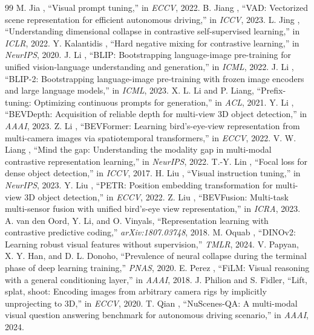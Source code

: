 \documentclass[10pt,twocolumn,letterpaper]{article}
\begin{document}
\begin{thebibliography}{99}
 M. Jia \etal, ``Visual prompt tuning,'' in \emph{ECCV}, 2022.
 B. Jiang \etal, ``VAD: Vectorized scene representation for efficient autonomous driving,'' in \emph{ICCV}, 2023.
 L. Jing \etal, ``Understanding dimensional collapse in contrastive self-supervised learning,'' in \emph{ICLR}, 2022.
 Y. Kalantidis \etal, ``Hard negative mixing for contrastive learning,'' in \emph{NeurIPS}, 2020.
 J. Li \etal, ``BLIP: Bootstrapping language-image pre-training for unified vision-language understanding and generation,'' in \emph{ICML}, 2022.
 J. Li \etal, ``BLIP-2: Bootstrapping language-image pre-training with frozen image encoders and large language models,'' in \emph{ICML}, 2023.
 X. L. Li and P. Liang, ``Prefix-tuning: Optimizing continuous prompts for generation,'' in \emph{ACL}, 2021.
 Y. Li \etal, ``BEVDepth: Acquisition of reliable depth for multi-view 3D object detection,'' in \emph{AAAI}, 2023.
 Z. Li \etal, ``BEVFormer: Learning bird's-eye-view representation from multi-camera images via spatiotemporal transformers,'' in \emph{ECCV}, 2022.
 V. W. Liang \etal, ``Mind the gap: Understanding the modality gap in multi-modal contrastive representation learning,'' in \emph{NeurIPS}, 2022.
 T.-Y. Lin \etal, ``Focal loss for dense object detection,'' in \emph{ICCV}, 2017.
 H. Liu \etal, ``Visual instruction tuning,'' in \emph{NeurIPS}, 2023.
 Y. Liu \etal, ``PETR: Position embedding transformation for multi-view 3D object detection,'' in \emph{ECCV}, 2022.
 Z. Liu \etal, ``BEVFusion: Multi-task multi-sensor fusion with unified bird's-eye view representation,'' in \emph{ICRA}, 2023.
 A. van den Oord, Y. Li, and O. Vinyals, ``Representation learning with contrastive predictive coding,'' \emph{arXiv:1807.03748}, 2018.
 M. Oquab \etal, ``DINOv2: Learning robust visual features without supervision,'' \emph{TMLR}, 2024.
 V. Papyan, X. Y. Han, and D. L. Donoho, ``Prevalence of neural collapse during the terminal phase of deep learning training,'' \emph{PNAS}, 2020.
 E. Perez \etal, ``FiLM: Visual reasoning with a general conditioning layer,'' in \emph{AAAI}, 2018.
 J. Philion and S. Fidler, ``Lift, splat, shoot: Encoding images from arbitrary camera rigs by implicitly unprojecting to 3D,'' in \emph{ECCV}, 2020.
 T. Qian \etal, ``NuScenes-QA: A multi-modal visual question answering benchmark for autonomous driving scenario,'' in \emph{AAAI}, 2024.

\end{thebibliography}
\end{document}
